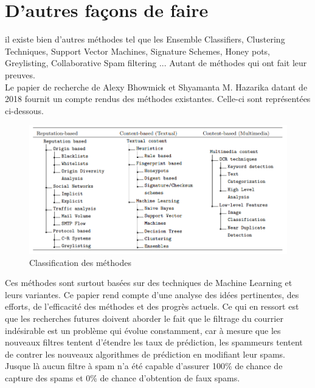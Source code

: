 \documentclass{article}
\begin{document}
\section{D'autres façons de faire}

il existe bien d'autres méthodes tel que les Ensemble Classifiers, Clustering Techniques, Support Vector Machines, Signature Schemes, Honey pots, Greylisting, Collaborative Spam filtering ... Autant de méthodes qui ont fait leur preuves. \\
Le papier de recherche de Alexy Bhowmick et Shyamanta M. Hazarika datant de 2018 fournit un compte rendus des méthodes existantes. Celle-ci sont représentées ci-dessous.\\ 
\begin{center}
\begin{figure}[h]
\includegraphics[scale=0.4]{classification.png}
\caption[]{Classification des méthodes}
\label{methodes}
\end{figure}
\end{center}

Ces méthodes sont surtout basées sur des techniques de Machine Learning et leurs variantes. Ce papier rend compte d'une analyse des idées pertinentes, des efforts, de l'efficacité des méthodes et des progrès actuels. Ce qui en ressort est que les recherches futures doivent aborder le fait que le filtrage du courrier indésirable est un problème qui évolue constamment, car à mesure que les nouveaux filtres tentent d'étendre les taux de prédiction, les spammeurs tentent de contrer les nouveaux algorithmes de prédiction en modifiant leur spams.\\Jusque là aucun filtre à spam n'a été capable d'assurer 100\% de chance de capture des spams et 0\% de chance d'obtention de faux spams.






\clearpage
\end{document}
